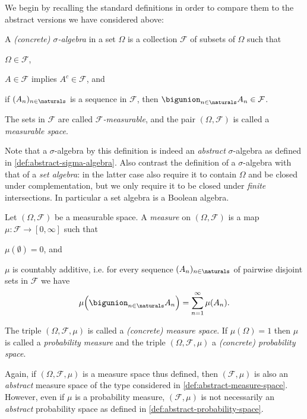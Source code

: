 \documentclass[article, a4paper, 11pt, oneside]{memoir}
\numberwithin{equation}{chapter}
\newcommand{\calF}{\mathcal{F}}
\begin{document}
We begin by recalling the standard definitions in order to compare them to the abstract versions we have considered above:

\begin{definition}
    A \emph{(concrete) $\sigma$-algebra} in a set $\Omega$ is a collection $\calF$ of subsets of $\Omega$ such that
    \begin{enumdef}
        \item $\Omega \in \calF$,
        \item $A \in \calF$ implies $A^c \in \calF$, and
        \item if $(A_n)_{n\in\naturals}$ is a sequence in $\calF$, then $\bigunion_{n\in\naturals} A_n \in \calF$.
    \end{enumdef}
    The sets in $\calF$ are called \emph{$\calF$-measurable}, and the pair $(\Omega, \calF)$ is called a \emph{measurable space}.
\end{definition}
%
Note that a $\sigma$-algebra by this definition is indeed an \emph{abstract} $\sigma$-algebra as defined in \cref{def:abstract-sigma-algebra}. Also contrast the definition of a $\sigma$-algebra with that of a \emph{set algebra}: in the latter case also require it to contain $\Omega$ and be closed under complementation, but we only require it to be closed under \emph{finite} intersections. In particular a set algebra is a Boolean algebra.


\begin{definition}
    Let $(\Omega, \calF)$ be a measurable space. A \emph{measure} on $(\Omega, \calF)$ is a map $\mu \colon \calF \to [0,\infty]$ such that
    \begin{enumdef}
        \item $\mu(\emptyset) = 0$, and
        \item $\mu$ is countably additive, i.e. for every sequence $(A_n)_{n\in\naturals}$ of pairwise disjoint sets in $\calF$ we have
        \begin{equation*}
            \mu \Bigl( \bigunion_{n\in\naturals} A_n \Bigr)
                = \sum_{n=1}^\infty \mu(A_n).
        \end{equation*}
    \end{enumdef}
    The triple $(\Omega, \calF, \mu)$ is called a \emph{(concrete) measure space}. If $\mu(\Omega) = 1$ then $\mu$ is called a \emph{probability measure} and the triple $(\Omega, \calF, \mu)$ a \emph{(concrete) probability space}.
\end{definition}
%
Again, if $(\Omega, \calF, \mu)$ is a measure space thus defined, then $(\calF, \mu)$ is also an \emph{abstract} measure space of the type considered in \cref{def:abstract-measure-space}. However, even if $\mu$ is a probability measure, $(\calF, \mu)$ is not necessarily an \emph{abstract} probability space as defined in \cref{def:abstract-probability-space}.
\end{document}
